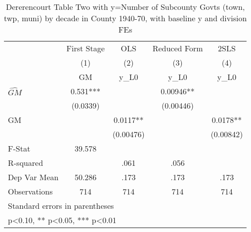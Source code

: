 \begin{table}[htbp]\centering
\def\sym#1{\ifmmode^{#1}\else\(^{#1}\)\fi}
\caption{Dererencourt Table Two with y=Number of Subcounty Govts (town, twp, muni) by decade in County 1940-70, with baseline y and division FEs}
\begin{tabular}{l*{4}{c}}
\toprule
                    & First Stage   &         OLS   &Reduced Form   &        2SLS   \\
                    &\multicolumn{1}{c}{(1)}&\multicolumn{1}{c}{(2)}&\multicolumn{1}{c}{(3)}&\multicolumn{1}{c}{(4)}\\
                    &\multicolumn{1}{c}{GM}&\multicolumn{1}{c}{y\_L0}&\multicolumn{1}{c}{y\_L0}&\multicolumn{1}{c}{y\_L0}\\
\midrule
$\hat{GM}$          &       0.531***&               &     0.00946** &               \\
                    &    (0.0339)   &               &   (0.00446)   &               \\
\addlinespace
GM                  &               &      0.0117** &               &      0.0178** \\
                    &               &   (0.00476)   &               &   (0.00842)   \\
\midrule
F-Stat              &      39.578   &               &               &               \\
R-squared           &               &        .061   &        .056   &               \\
Dep Var Mean        &      50.286   &        .173   &        .173   &        .173   \\
Observations        &         714   &         714   &         714   &         714   \\
\bottomrule
\multicolumn{5}{l}{\footnotesize Standard errors in parentheses}\\
\multicolumn{5}{l}{\footnotesize * p<0.10, ** p<0.05, *** p<0.01}\\
\end{tabular}
\end{table}
